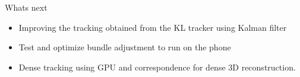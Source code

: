 \documentclass{beamer}
\begin{document}
\begin{frame}{Whats next}{}
	\begin{itemize}
		\item Improving the tracking obtained from the KL tracker using Kalman filter
		\item Test and optimize bundle adjustment to run on the phone
		\item Dense tracking using GPU and correspondence for dense 3D reconstruction.
	\end{itemize}
\end{frame}


\end{document}
